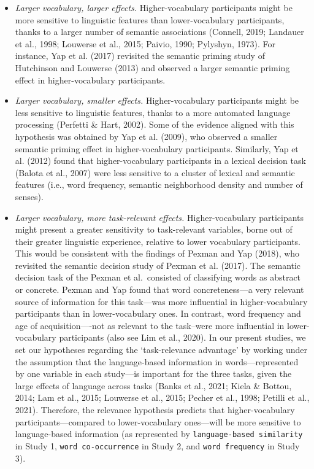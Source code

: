 \documentclass[
  12pt,
  man,floatsintext]{apa7}
\begin{document}
\begin{itemize}
\item
  \emph{Larger vocabulary, larger effects.} Higher-vocabulary participants might be more sensitive to linguistic features than lower-vocabulary participants, thanks to a larger number of semantic associations (Connell, 2019; Landauer et al., 1998; Louwerse et al., 2015; Paivio, 1990; Pylyshyn, 1973). For instance, Yap et al. (2017) revisited the semantic priming study of Hutchinson and Louwerse (2013) and observed a larger semantic priming effect in higher-vocabulary participants.
\item
  \emph{Larger vocabulary, smaller effects.} Higher-vocabulary participants might be less sensitive to linguistic features, thanks to a more automated language processing (Perfetti \& Hart, 2002). Some of the evidence aligned with this hypothesis was obtained by Yap et al. (2009), who observed a smaller semantic priming effect in higher-vocabulary participants. Similarly, Yap et al. (2012) found that higher-vocabulary participants in a lexical decision task (Balota et al., 2007) were less sensitive to a cluster of lexical and semantic features (i.e., word frequency, semantic neighborhood density and number of senses).
\item
  \emph{Larger vocabulary, more task-relevant effects.} Higher-vocabulary participants might present a greater sensitivity to task-relevant variables, borne out of their greater linguistic experience, relative to lower vocabulary participants. This would be consistent with the findings of Pexman and Yap (2018), who revisited the semantic decision study of Pexman et al. (2017). The semantic decision task of the Pexman et al.~consisted of classifying words as abstract or concrete. Pexman and Yap found that word concreteness---a very relevant source of information for this task---was more influential in higher-vocabulary participants than in lower-vocabulary ones. In contrast, word frequency and age of acquisition----not as relevant to the task--were more influential in lower-vocabulary participants (also see Lim et al., 2020). In our present studies, we set our hypotheses regarding the `task-relevance advantage' by working under the assumption that the language-based information in words---represented by one variable in each study---is important for the three tasks, given the large effects of language across tasks (Banks et al., 2021; Kiela \& Bottou, 2014; Lam et al., 2015; Louwerse et al., 2015; Pecher et al., 1998; Petilli et al., 2021). Therefore, the relevance hypothesis predicts that higher-vocabulary participants---compared to lower-vocabulary ones---will be more sensitive to language-based information (as represented by \texttt{language-based\ similarity} in Study 1, \texttt{word\ co-occurrence} in Study 2, and \texttt{word\ frequency} in Study 3).
\end{itemize}
\end{document}
